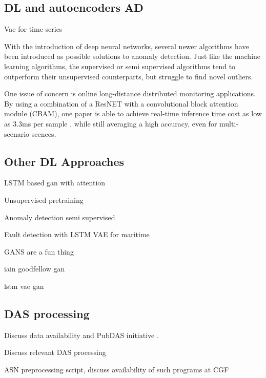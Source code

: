 \subsection{DL and autoencoders AD}


Vae for time series \cite{desai2021timevae}

With the introduction of deep neural networks, several newer algorithms have been introduced as possible solutions to anomaly detection. Just like the machine learning algorithms, the supervised or semi supervised algorithms tend to outperform their unsupervised counterparts, but struggle to find novel outliers. 



One issue of concern is online long-distance distributed monitoring applications. By using a combination of a ResNET with a convolutional block attention module (CBAM), one paper is able to achieve real-time inference time cost as low as 3.3ms per sample \cite{photonics9100677}, while still averaging a high accuracy, even for multi-scenario scences. 


\subsection{Other DL Approaches}


LSTM based gan with attention \cite{bashar2023algan} 

Unsupervised pretraining \cite{alaaDeepLstm2019}

Anomaly detection semi supervised \cite{huang2021esad}

Fault detection with LSTM VAE for maritime \cite{9514856} 

GANS are a fun thing \cite{jiang2023unsupervised}

iain goodfellow gan \cite{goodfellow2016nips}

lstm vae gan \cite{s20133738}



\subsection{DAS processing}

Discuss data availability and PubDAS initiative \cite{spica2023pubdas}. 

Discuss relevant DAS processing 

ASN preprocessing script, discuss availability of such programs at CGF

